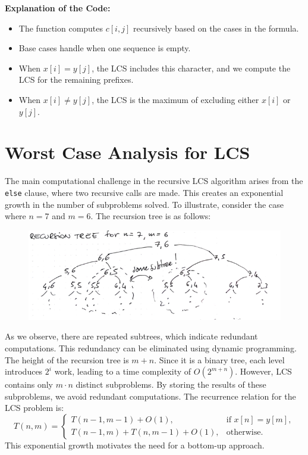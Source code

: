 \textbf{Explanation of the Code:}
\begin{itemize}
    \item The function computes \(c[i, j]\) recursively based on the cases in the formula.
    \item Base cases handle when one sequence is empty.
    \item When \(x[i] = y[j]\), the LCS includes this character, and we compute the LCS for the remaining prefixes.
    \item When \(x[i] \neq y[j]\), the LCS is the maximum of excluding either \(x[i]\) or \(y[j]\).
\end{itemize}

\section{Worst Case Analysis for LCS}

The main computational challenge in the recursive LCS algorithm arises from the \texttt{else} clause, where two recursive calls are made. This creates an exponential growth in the number of subproblems solved. To illustrate, consider the case where $n=7$ and $m=6$. The recursion tree is as follows:

\begin{figure}[h!]
    \centering
    \includegraphics[width=1\linewidth]{immagini//capitolo 13/13_6.png}
    \label{fig:enter-label}
\end{figure}
As we observe, there are repeated subtrees, which indicate redundant computations. This redundancy can be eliminated using dynamic programming. The height of the recursion tree is $m+n$. Since it is a binary tree, each level introduces $2^i$ work, leading to a time complexity of $O(2^{m+n})$. However, LCS contains only $m \cdot n$ distinct subproblems. By storing the results of these subproblems, we avoid redundant computations. \newpage
The recurrence relation for the LCS problem is:
\[
T(n,m) = \begin{cases}
    T(n-1,m-1) + O(1), & \text{if } x[n] = y[m], \\
    T(n-1,m) + T(n,m-1) + O(1), & \text{otherwise}.
\end{cases}
\]
This exponential growth motivates the need for a bottom-up approach.

